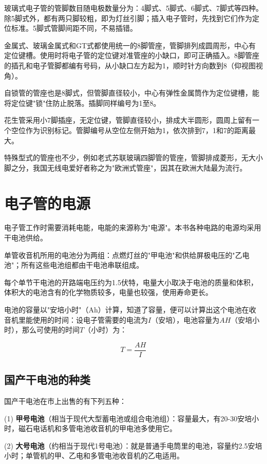 \documentclass[12pt,UTF8]{ctexbook}
\begin{document}
玻璃式电子管的管脚数目随电极数量分为：4脚式、5脚式、6脚式、7脚式等四种。除5脚式外，都有两只脚较粗，即为灯丝引脚；插入电子管时，先找到它们作为定位标准。5脚式管脚间距不同，不易插错。

金属式、玻璃金属式和GT式都使用统一的8脚管座，管脚排列成圆周形，中心有定位键槽。使用时将电子管的定位键对准管座的小缺口，即可正确插入。8脚管座的插孔和电子管脚都编有号码，从小缺口左方起为1，顺时针方向数到8（仰视图视角）。

自锁管的管座也是8脚式，但管脚直径较小，中心有弹性金属筒作为定位键槽，能将定位键"锁"住防止脱落。插脚同样编号为1至8。

花生管采用小7脚插座，无定位键，管脚直径较小，排成大半圆形，圆周上留有一个空位作为识别标记。管脚编号从空位左侧开始为1，依次排到7，1和7的距离最大。

特殊型式的管座也不少，例如老式苏联玻璃四脚管的管座，管脚排成菱形，无大小脚之分，我国无线电爱好者称之为"欧洲式管座"，因其在欧洲大陆最为流行。

\section{电子管的电源}

电子管工作时需要消耗电能，电能的来源称为"电源"。本书各种电路的电源均采用干电池供给。

单管收音机所用的电池分为两组：点燃灯丝的"甲电池"和供给屏极电压的"乙电池"；所有这些电池组都由干电池串联组成。

每个单节干电池的开路端电压约为1.5伏特，电量大小取决于电池的质量和体积，体积大的电池含有的化学物质较多，电量也较强，使用寿命更长。

电池的容量以"安培小时"（Ah）计算，知道了容量，便可以计算出这个电池在收音机里能使用的时间：设电子管需要的电流为$I$（安培），电池容量为$AH$（安培小时），那么可使用的时间$T$（小时）为：

\[ T = \frac{AH}{I} \]

\subsection{国产干电池的种类}

国产干电池在市上出售的有下列五种：

(1) \textbf{甲号电池}（相当于现代大型蓄电池或组合电池组）：容量最大，有20-30安培小时，磁石电话机和多管电池收音机的甲电池多使用它。

(2) \textbf{大号电池}（约相当于现代1号电池）：就是普通手电筒里的电池，容量约2.5安培小时；单管机的甲、乙电和多管电池收音机的乙电适用。
\end{document}
